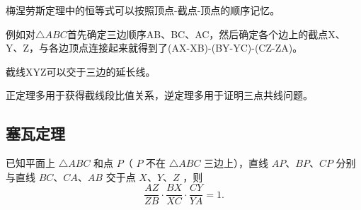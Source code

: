 \begin{remark}
    梅涅劳斯定理中的恒等式可以按照顶点-截点-顶点的顺序记忆。
    
    例如对$\triangle ABC$首先确定三边顺序AB、BC、AC，然后确定各个边上的截点X、Y、Z，与各边顶点连接起来就得到了(AX-XB)-(BY-YC)-(CZ-ZA)。

    截线XYZ可以交于三边的延长线。

    正定理多用于获得截线段比值关系，逆定理多用于证明三点共线问题。
\end{remark}
\newpage 
\subsection{塞瓦定理}
\begin{theorem}[塞瓦(Ceva)定理]
    已知平面上 $\triangle A B C$ 和点 $P$（ $P$ 不在 $\triangle A B C$ 三边上），直线 $A P 、 B P 、 C P$ 分别与直线 $B C 、 C A 、 A B$ 交于点 $X 、 Y 、 Z$ ，则 
    $$\frac{A Z}{Z B} \cdot \frac{B X}{X C} \cdot \frac{C Y}{Y A}=1.$$
\end{theorem}


